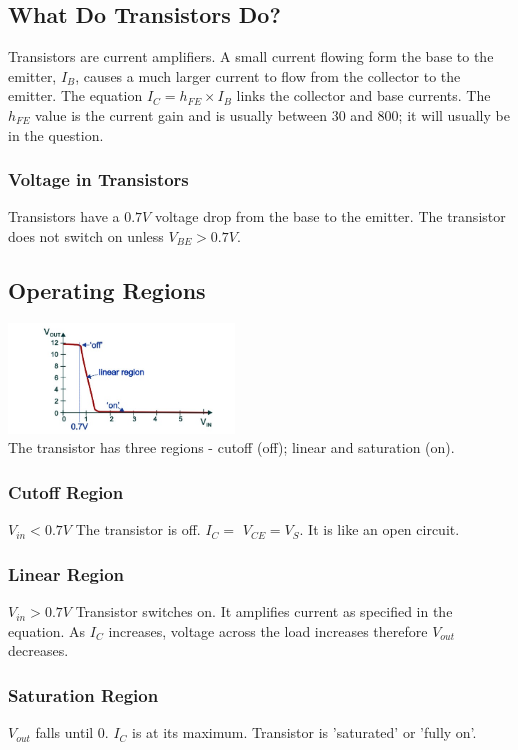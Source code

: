 \documentclass[a4paper,11pt, twocolumn]{article}
\begin{document}
\subsection{What Do Transistors Do?}
Transistors are current amplifiers. A small current flowing form the base to the emitter, $I_B$, causes a much larger current to flow from the collector to the emitter. The equation $\displaystyle I_C = h_{FE} \times I_B$ links the collector and base currents. The $h_{FE}$ value is the current gain and is usually between 30 and 800; it will usually be in the question.
\subsubsection{Voltage in Transistors}
Transistors have a $0.7V$ voltage drop from the base to the emitter. The transistor does not switch on unless $V_{BE} > 0.7V$. 
\subsection{Operating Regions}
\includegraphics[width=0.45\textwidth]{bjt regions.jpg}\\
The transistor has three regions - cutoff (off); linear and saturation (on). 
\subsubsection{Cutoff Region}
$V_{in} < 0.7V$ The transistor is off. $I_C = $ $V_{CE} = V_S$. It is like an open circuit.
\subsubsection{Linear Region}
$V_{in}>0.7V$ Transistor switches on. It amplifies current as specified in the equation. As $I_C$ increases, voltage across the load increases therefore $V_{out}$ decreases.
\subsubsection{Saturation Region}
$V_{out}$ falls until 0. $I_C$ is at its maximum. Transistor is 'saturated' or 'fully on'.
\end{document}
